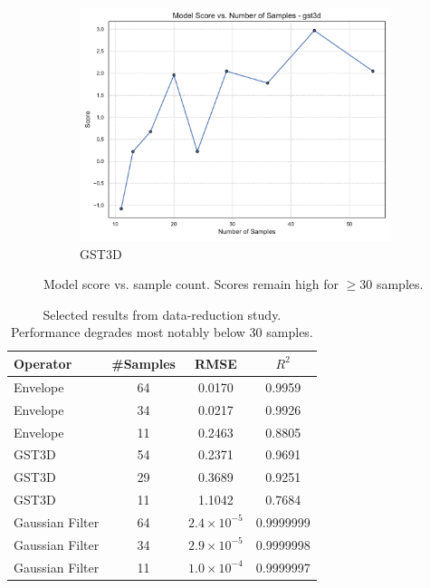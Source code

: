 \begin{figure}[htbp]
\begin{subfigure}[t]{0.32\textwidth}
        \includegraphics[width=\textwidth]{assets/images/05/score_by_sample_size_gst3d}
        \caption{\ac{GST3D}}
    \end{subfigure}
    \caption{Model score vs. sample count. Scores remain high for $\geq 30$ samples.}
    \label{fig:score_by_sample_size_operators}
\end{figure}

\begin{table}[htbp]
    \centering
    \begin{tabular}{lccc}
        \hline
        \textbf{Operator} & \textbf{\#Samples} & \textbf{\ac{RMSE}} & \textbf{$R^2$} \\
        \hline
        Envelope          & 64                 & 0.0170             & 0.9959         \\
        Envelope          & 34                 & 0.0217             & 0.9926         \\
        Envelope          & 11                 & 0.2463             & 0.8805         \\
        \ac{GST3D}        & 54                 & 0.2371             & 0.9691         \\
        \ac{GST3D}        & 29                 & 0.3689             & 0.9251         \\
        \ac{GST3D}        & 11                 & 1.1042             & 0.7684         \\
        Gaussian Filter   & 64                 & $2.4\times10^{-5}$ & 0.9999999      \\
        Gaussian Filter   & 34                 & $2.9\times10^{-5}$ & 0.9999998      \\
        Gaussian Filter   & 11                 & $1.0\times10^{-4}$ & 0.9999997      \\
        \hline
    \end{tabular}
    \caption{Selected results from data-reduction study. Performance degrades most notably below 30 samples.}
    \label{tab:data_reduction_summary}
\end{table}

